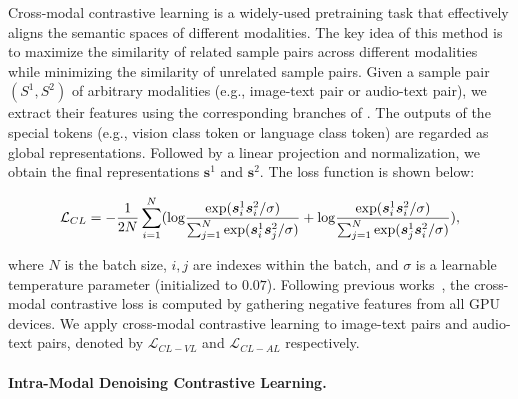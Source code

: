 Cross-modal contrastive learning is a widely-used pretraining task that effectively aligns the semantic spaces of different modalities. 
The key idea of this method is to maximize the similarity of related sample pairs across different modalities while minimizing the similarity of unrelated sample pairs.
Given a sample pair $(S^1, S^2)$ of arbitrary modalities (e.g., image-text pair or audio-text pair), we extract their features using the corresponding branches of \onepeace.
The outputs of the special tokens (e.g., vision class token or language class token) are regarded as global representations. Followed by a linear projection and normalization, we obtain the final representations $\bm{s}^1$ and $\bm{s}^2$. The loss function is shown below:

\begin{equation}
\mathcal{L}_{CL} = -\frac{1}{2N}\sum_{i=1}^{N}({\rm log}\frac{{\rm exp}(\bm{s}_i^{1}\bm{s}_i^{2}/\sigma)}{\sum_{j=1}^{N}{\rm exp}(\bm{s}_i^1\bm{s}_j^2/\sigma)} + {\rm log}\frac{{\rm exp}(\bm{s}_i^{1}\bm{s}_i^{2}/\sigma)}{\sum_{j=1}^{N}{\rm exp}(\bm{s}_j^1\bm{s}_i^2/\sigma)}),
\end{equation}

where $N$ is the batch size, $i,j$ are indexes within the batch, and $\sigma$ is a learnable temperature parameter (initialized to $0.07$). Following previous works~\cite{clip,align}, the cross-modal contrastive loss is computed by gathering negative features from all GPU devices.
We apply cross-modal contrastive learning to image-text pairs and audio-text pairs, denoted by $\mathcal{L}_{CL-VL}$ and $\mathcal{L}_{CL-AL}$ respectively.

\paragraph{Intra-Modal Denoising Contrastive Learning.}


